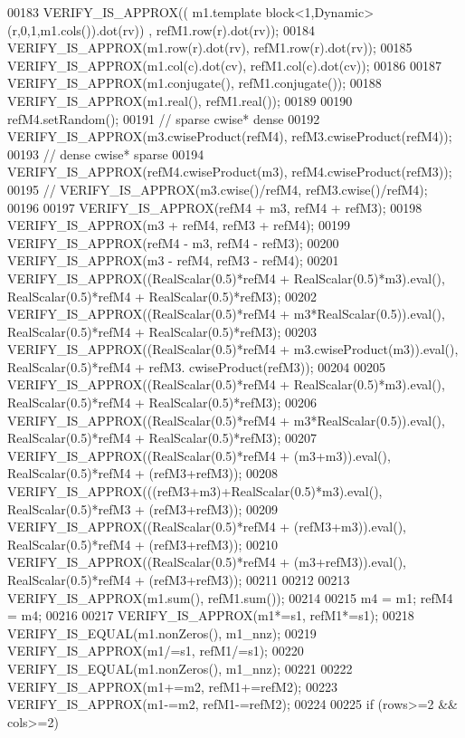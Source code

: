 \begin{DoxyCode}
00183     VERIFY\_IS\_APPROX(( m1.template block<1,Dynamic>(r,0,1,m1.cols()).dot(rv)) , refM1.row(r).dot(rv));
00184     VERIFY\_IS\_APPROX(m1.row(r).dot(rv), refM1.row(r).dot(rv));
00185     VERIFY\_IS\_APPROX(m1.col(c).dot(cv), refM1.col(c).dot(cv));
00186 
00187     VERIFY\_IS\_APPROX(m1.conjugate(), refM1.conjugate());
00188     VERIFY\_IS\_APPROX(m1.real(), refM1.real());
00189 
00190     refM4.setRandom();
00191     \textcolor{comment}{// sparse cwise* dense}
00192     VERIFY\_IS\_APPROX(m3.cwiseProduct(refM4), refM3.cwiseProduct(refM4));
00193     \textcolor{comment}{// dense cwise* sparse}
00194     VERIFY\_IS\_APPROX(refM4.cwiseProduct(m3), refM4.cwiseProduct(refM3));
00195 \textcolor{comment}{//     VERIFY\_IS\_APPROX(m3.cwise()/refM4, refM3.cwise()/refM4);}
00196 
00197     VERIFY\_IS\_APPROX(refM4 + m3, refM4 + refM3);
00198     VERIFY\_IS\_APPROX(m3 + refM4, refM3 + refM4);
00199     VERIFY\_IS\_APPROX(refM4 - m3, refM4 - refM3);
00200     VERIFY\_IS\_APPROX(m3 - refM4, refM3 - refM4);
00201     VERIFY\_IS\_APPROX((RealScalar(0.5)*refM4 + RealScalar(0.5)*m3).eval(), RealScalar(0.5)*refM4 + 
      RealScalar(0.5)*refM3);
00202     VERIFY\_IS\_APPROX((RealScalar(0.5)*refM4 + m3*RealScalar(0.5)).eval(), RealScalar(0.5)*refM4 + 
      RealScalar(0.5)*refM3);
00203     VERIFY\_IS\_APPROX((RealScalar(0.5)*refM4 + m3.cwiseProduct(m3)).eval(), RealScalar(0.5)*refM4 + refM3.
      cwiseProduct(refM3));
00204 
00205     VERIFY\_IS\_APPROX((RealScalar(0.5)*refM4 + RealScalar(0.5)*m3).eval(), RealScalar(0.5)*refM4 + 
      RealScalar(0.5)*refM3);
00206     VERIFY\_IS\_APPROX((RealScalar(0.5)*refM4 + m3*RealScalar(0.5)).eval(), RealScalar(0.5)*refM4 + 
      RealScalar(0.5)*refM3);
00207     VERIFY\_IS\_APPROX((RealScalar(0.5)*refM4 + (m3+m3)).eval(), RealScalar(0.5)*refM4 + (refM3+refM3));
00208     VERIFY\_IS\_APPROX(((refM3+m3)+RealScalar(0.5)*m3).eval(), RealScalar(0.5)*refM3 + (refM3+refM3));
00209     VERIFY\_IS\_APPROX((RealScalar(0.5)*refM4 + (refM3+m3)).eval(), RealScalar(0.5)*refM4 + (refM3+refM3));
00210     VERIFY\_IS\_APPROX((RealScalar(0.5)*refM4 + (m3+refM3)).eval(), RealScalar(0.5)*refM4 + (refM3+refM3));
00211 
00212 
00213     VERIFY\_IS\_APPROX(m1.sum(), refM1.sum());
00214 
00215     m4 = m1; refM4 = m4;
00216 
00217     VERIFY\_IS\_APPROX(m1*=s1, refM1*=s1);
00218     VERIFY\_IS\_EQUAL(m1.nonZeros(), m1\_nnz);
00219     VERIFY\_IS\_APPROX(m1/=s1, refM1/=s1);
00220     VERIFY\_IS\_EQUAL(m1.nonZeros(), m1\_nnz);
00221 
00222     VERIFY\_IS\_APPROX(m1+=m2, refM1+=refM2);
00223     VERIFY\_IS\_APPROX(m1-=m2, refM1-=refM2);
00224 
00225     \textcolor{keywordflow}{if} (rows>=2 && cols>=2)

\end{DoxyCode}
